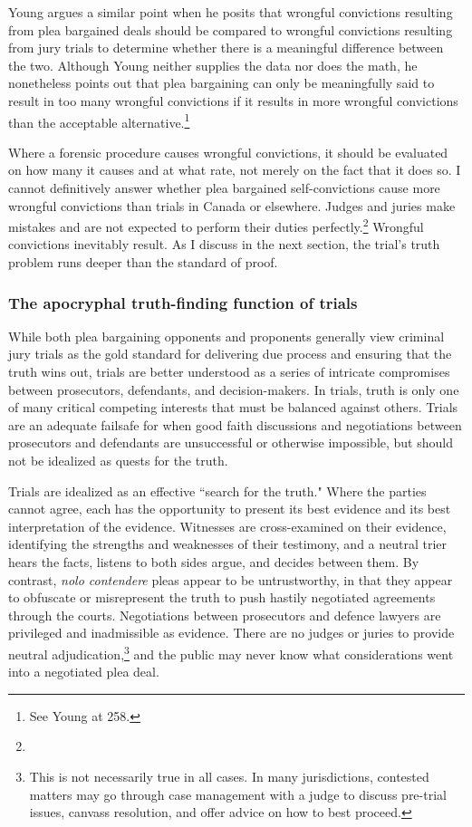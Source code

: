 Young argues a similar point when he posits that wrongful convictions resulting from plea bargained deals should be compared to wrongful convictions resulting from jury trials to determine whether there is a meaningful difference between the two. Although Young neither supplies the data nor does the math, he nonetheless points out that plea bargaining can only be meaningfully said to result in too many wrongful convictions if it results in more wrongful convictions than the acceptable alternative.\footnote{See Young at 258.} 

Where a forensic procedure causes wrongful convictions, it should be evaluated on how many it causes and at what rate, not merely on the fact that it does so. I cannot definitively answer whether plea bargained self-convictions cause more wrongful convictions than trials in Canada or elsewhere. Judges and juries make mistakes and are not expected to perform their duties perfectly.\footnote{} Wrongful convictions inevitably result. As I discuss in the next section, the trial's truth problem runs deeper than the standard of proof.

\subsubsection{The apocryphal truth-finding function of trials}

While both plea bargaining opponents and proponents generally view criminal jury trials as the gold standard for delivering due process and ensuring that the truth wins out, trials are better understood as a series of intricate compromises between prosecutors, defendants, and decision-makers. In trials, truth is only one of many critical competing interests that must be balanced against others. Trials are an adequate failsafe for when good faith discussions and negotiations between prosecutors and defendants are unsuccessful or otherwise impossible, but should not be idealized as quests for the truth.

Trials are idealized as an effective ``search for the truth." Where the parties cannot agree, each has the opportunity to present its best evidence and its best interpretation of the evidence. Witnesses are cross-examined on their evidence, identifying the strengths and weaknesses of their testimony, and a neutral trier hears the facts, listens to both sides argue, and decides between them. By contrast, \textit{nolo contendere} pleas appear to be untrustworthy, in that they appear to obfuscate or misrepresent the truth to push hastily negotiated agreements through the courts. Negotiations between prosecutors and defence lawyers are privileged and inadmissible as evidence. There are no judges or juries to provide neutral adjudication,\footnote{This is not necessarily true in all cases. In many jurisdictions, contested matters may go through case management with a judge to discuss pre-trial issues, canvass resolution, and offer advice on how to best proceed.} and the public may never know what considerations went into a negotiated plea deal. 

